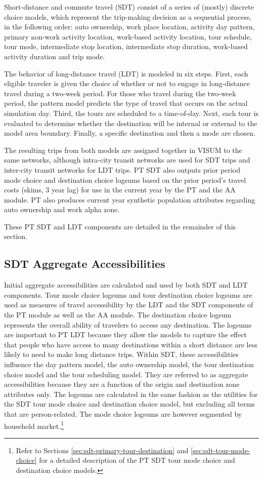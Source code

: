Short-distance and commute travel (SDT) consist of a series of (mostly) discrete choice models, which represent the trip-making decision as a sequential process, in the following order:  auto ownership, work place location, activity day pattern, primary non-work activity location, work-based activity location, tour schedule, tour mode, intermediate stop location, intermediate stop duration, work-based activity duration and trip mode. 

The behavior of long-distance travel (LDT) is modeled in six steps. First, each eligible traveler is given the choice of whether or not to engage in long-distance travel during a two-week period. For those who travel during the two-week period, the pattern model predicts the type of travel that occurs on the actual simulation day. Third, the tours are scheduled to a time-of-day. Next, each tour is evaluated to determine whether the destination will be internal or external to the model area boundary. Finally, a specific destination and then a mode are chosen.

The resulting trips from both models are assigned together in VISUM to the same networks, although intra-city transit networks are used for SDT trips and inter-city transit networks for LDT trips. PT SDT also outputs prior period mode choice and destination choice logsums based on the prior period's travel costs (skims, 3 year lag) for use in the current year by the PT and the AA module. PT also produces current year synthetic population attributes regarding auto ownership and work alpha zone. 

These PT SDT and LDT components are detailed in the remainder of this section.

\subsection{SDT Aggregate Accessibilities}\label{sec:sdt-aggregate-accessibilities}
Initial aggregate accessibilities are calculated and used by both SDT and LDT components. Tour mode choice logsums and tour destination choice logsums are used as measures of travel accessibility by the LDT and the SDT components of the PT module as well as the AA module. The destination choice logsum represents the overall ability of travelers to access any destination. The logsums are important to PT LDT because they allow the models to capture the effect that people who have access to many destinations within a short distance are less likely to need to make long distance trips. Within SDT, these accessibilities influence the day pattern model, the auto ownership model, the tour destination choice model and the tour scheduling model. They are referred to as aggregate accessibilities because they are a function of the origin and destination zone attributes only. The logsums are calculated in the same fashion as the utilities for the SDT tour mode choice and destination choice model, but excluding all terms that are person-related. The mode choice logsums are however segmented by household market.\footnote{Refer to Sections \ref{sec:sdt-primary-tour-destination} and \ref{sec:sdt-tour-mode-choice} for a detailed description of the PT SDT tour mode choice and destination choice models.}

